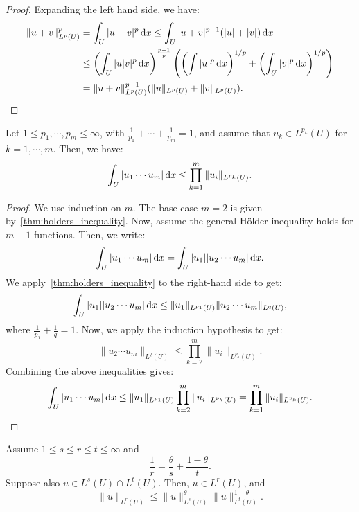 \begin{proof}
  Expanding the left hand side, we have:
  \begin{align*}
    \|u + v\|_{L^p(U)}^p &= \int_U |u + v|^p \dx \le \int_U |u + v|^{p-1} (|u| + |v|) \dx \\
                          &\le \left(\int_U |u | v|^p \dx\right)^{\frac{p-1}{p}}\left(\left(\int |u|^p \dx\right)^{1/p} + \left(\int_U |v|^p \dx\right)^{1/p}\right) \\
                          &= \|u + v\|_{L^p(U)}^{p-1} (\|u\|_{L^p(U)} + \|v\|_{L^p(U)})
  .\qedhere\end{align*}
\end{proof}

\begin{theorem}
  \label{thm:general_holders_inequality}

  Let $1 \le p_1, \cdots, p_m \le \infty$, with $\frac{1}{p_1} + \cdots + \frac{1}{p_m} = 1$, and assume that $u_k \in L^{p_k}(U)$ for $k = 1, \cdots, m$. Then, we have:
  \begin{equation}\label{eq:general_holders_inequality}
    \int_U |u_1 \cdots u_m| \dx \le \prod_{k=1}^m \|u_i\|_{L^{p_k}(U)}
  .\end{equation}
\end{theorem}

\begin{proof}
  We use induction on $m$. The base case $m = 2$ is given by~\cref{thm:holders_inequality}. Now, assume the general H\"older inequality holds for $m-1$ functions. Then, we write:
  \[%
    \int_U |u_1 \cdots u_m| \dx = \int_U |u_1| |u_2 \cdots u_m| \dx
  .\]%
  We apply~\cref{thm:holders_inequality} to the right-hand side to get:
  \[%
    \int_U |u_1| |u_2 \cdots u_m| \dx \le \|u_1\|_{L^{p_1}(U)} \|u_2 \cdots u_m\|_{L^{q}(U)}
  ,\]%
  where $\frac{1}{p_1} + \frac{1}{q} = 1$. Now, we apply the induction hypothesis to get:
  \[%
    \|u_2 \cdots u_m\|_{L^{q}(U)} \le \prod_{k=2}^m \|u_i\|_{L^{p_k}(U)}
  .\]%
  Combining the above inequalities gives:
  \[%
    \int_U |u_1 \cdots u_m| \dx \le \|u_1\|_{L^{p_1}(U)} \prod_{k=2}^m \|u_i\|_{L^{p_k}(U)} = \prod_{k=1}^m \|u_i\|_{L^{p_k}(U)}
  .\qedhere\]%
\end{proof}

\begin{theorem}
  \label{thm:interpolation_inequality_lp}

  Assume $1 \le s \le r \le t \le \infty$ and
  \[%
    \frac{1}{r} = \frac{\theta}{s} + \frac{1 - \theta}{t}
  .\]%
  Suppose also $u \in L^s(U) \cap L^t(U)$. Then, $u \in L^r(U)$, and
  \begin{equation}\label{eq:interpolation_inequality_lp}
    \|u\|_{L^r(U)} \le \|u\|_{L^s(U)}^\theta \|u\|_{L^t(U)}^{1-\theta}
  .\end{equation}
\end{theorem}

